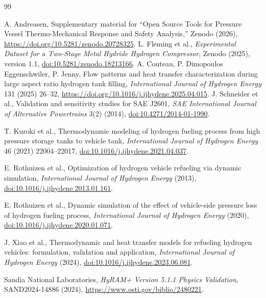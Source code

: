 \documentclass[12pt,a4paper]{article}
\begin{document}
\begin{thebibliography}{99}

A. Andreasen, Supplementary material for ``Open Source Tools for Pressure Vessel
Thermo-Mechanical Response and Safety Analysis,'' Zenodo (2026),
\url{https://doi.org/10.5281/zenodo.20728325}.
L. Fleming et al., \textit{Experimental Dataset for a Two-Stage Metal Hydride
Hydrogen Compressor}, Zenodo (2025), version 1.1,
\href{https://doi.org/10.5281/zenodo.18213166}{doi:10.5281/zenodo.18213166}.
A. Couteau, P. Dimopoulos Eggenschwiler, P. Jenny, Flow patterns and heat
transfer characterization during large aspect ratio hydrogen tank filling,
\textit{International Journal of Hydrogen Energy} 131 (2025) 26--32,
\url{https://doi.org/10.1016/j.ijhydene.2025.04.015}.
J. Schneider et al., Validation and sensitivity studies for SAE J2601,
\textit{SAE International Journal of Alternative Powertrains} 3(2) (2014),
\href{https://doi.org/10.4271/2014-01-1990}{doi:10.4271/2014-01-1990}.

T. Kuroki et al., Thermodynamic modeling of hydrogen fueling process from high
pressure storage tanks to vehicle tank, \textit{International Journal of Hydrogen
Energy} 46 (2021) 22004--22017,
\href{https://doi.org/10.1016/j.ijhydene.2021.04.037}{doi:10.1016/j.ijhydene.2021.04.037}.

E. Rothuizen et al., Optimization of hydrogen vehicle refueling via dynamic
simulation, \textit{International Journal of Hydrogen Energy} (2013),
\href{https://doi.org/10.1016/j.ijhydene.2013.01.161}{doi:10.1016/j.ijhydene.2013.01.161}.

E. Rothuizen et al., Dynamic simulation of the effect of vehicle-side pressure
loss of hydrogen fueling process, \textit{International Journal of Hydrogen Energy}
(2020), \href{https://doi.org/10.1016/j.ijhydene.2020.01.071}{doi:10.1016/j.ijhydene.2020.01.071}.

J. Xiao et al., Thermodynamic and heat transfer models for refueling hydrogen
vehicles: formulation, validation and application, \textit{International Journal
of Hydrogen Energy} (2024),
\href{https://doi.org/10.1016/j.ijhydene.2023.06.081}{doi:10.1016/j.ijhydene.2023.06.081}.

Sandia National Laboratories, \textit{HyRAM+ Version 5.1.1 Physics Validation},
SAND2024-14886 (2024), \url{https://www.osti.gov/biblio/2480221}.


\end{thebibliography}
\end{document}

